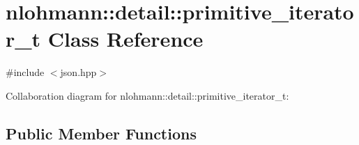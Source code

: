 \hypertarget{classnlohmann_1_1detail_1_1primitive__iterator__t}{}\section{nlohmann\+:\+:detail\+:\+:primitive\+\_\+iterator\+\_\+t Class Reference}
\label{classnlohmann_1_1detail_1_1primitive__iterator__t}


{\ttfamily \#include $<$json.\+hpp$>$}



Collaboration diagram for nlohmann\+:\+:detail\+:\+:primitive\+\_\+iterator\+\_\+t\+:
\subsection*{Public Member Functions}
